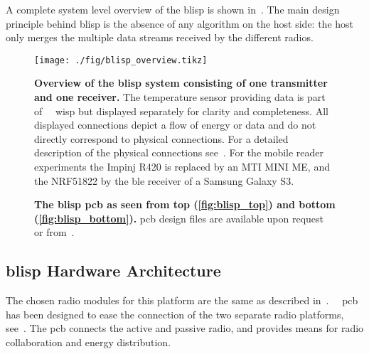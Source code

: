 \documentclass[conference,letterpaper,twoside,final,10pt]{IEEEtran}
\begin{document}
A complete system level overview of the \ac{blisp} is shown in~.
The main design principle behind \ac{blisp} is the absence of any algorithm on the host side: the host only merges the multiple data streams received by the different radios.

\begin{figure}
	\centering
	\texttt{[image: ./fig/blisp\_overview.tikz]}
	\caption{\textbf{Overview of the \acs{blisp} system consisting of one transmitter and one receiver.}
	The temperature sensor providing data is part of {~~}\ac{wisp} but displayed separately for clarity and completeness.
	All displayed connections depict a flow of energy or data and do not directly correspond to physical connections.
	For a detailed description of the physical connections see~\cite{blisp2015repo}.
	\textsuperscript{\dag}For the mobile reader experiments the Impinj R420 is replaced by an MTI MINI ME, and the NRF51822 by the \ac{ble} receiver of a Samsung Galaxy S3.}
	\label{fig:blisp_overview}
\end{figure}

\begin{figure}
	\centering
\caption{\textbf{The \acs{blisp} \ac{pcb} as seen from top (\cref{fig:blisp_top}) and bottom (\cref{fig:blisp_bottom}).}
		\ac{pcb} design files are available upon request or from~\cite{blisp2015repo}.
	}
	\label{fig:blisp_pcb}
\end{figure}

\subsection{\acs{blisp} Hardware Architecture}
\label{sec:blisp_hardware}

The chosen radio modules for this platform are the same as described in~.
{~~}\ac{pcb} has been designed to ease the connection of the two separate radio platforms, see~.
The \ac{pcb} connects the active and passive radio, and provides means for radio collaboration and energy distribution.
\end{document}
